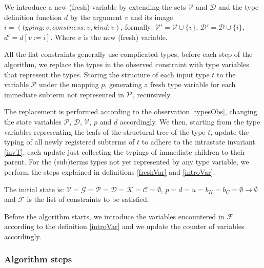 \begin{defn}
    \label{introVar}
    We introduce a new (fresh) variable by extending the sets $\mathcal{V}$ and $\mathcal{D}$
    and the type definition function $d$ by the argument $v$ and its image $i = (typing: v, constness: v, kind: v)$, formally: $\mathcal{V}' = \mathcal{V} \cup \{v\}$, $\mathcal{D}' = \mathcal{D} \cup \{i\}$, $d' = d [v := i]$. Where $v$ is the new (fresh) variable.
\end{defn}
\begin{defn}
    \label{presteps}

    All the flat constraints generally use complicated types, before each step of the algorithm, we replace the types in the observed constraint with type variables that represent the types. Storing the structure of each input type $t$ to the variable $\mathcal P$ under the mapping $p$, generating a fresh type variable for each immediate subterm not represented in $\mathcal P$, recursively.

    The replacement is performed according to the observation \ref{typesObs}, changing the state variables $\mathcal{P}$, $\mathcal{D}$, $\mathcal{V}$, $p$ and $d$ accordingly. We then, starting from the type variables representing the leafs of the structural tree of the type $t$, update the typing of all newly registered subterms of $t$ to adhere to the intrastate invariant \ref{invT}, each update just collecting the typings of immediate children to their parent. For the (sub)terms types not yet represented by any type variable, we perform the steps explained in definitions \ref{freshVar} and \ref{introVar}.
\end{defn}

\begin{defn}
    The initial state is: $\mathcal{V} = \mathcal{G} = \mathcal{P} = \mathcal{D} = \mathcal{K} = \mathcal{C} = \emptyset$, $p = d = u = b_K = b_C = \emptyset \to \emptyset$ and $\mathcal{F}$ is the list of constraints to be satisfied.

    Before the algorithm starts, we introduce the variables encountered in $\mathcal{F}$ according to the definition \ref{introVar} and we update the counter of variables accordingly.
\end{defn}

\subsubsection{Algorithm steps}

